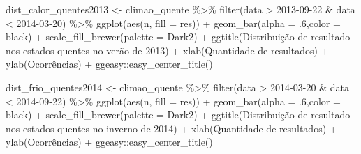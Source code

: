 \documentclass[
]{article}
\newenvironment{Shaded}{\begin{snugshade}}{\end{snugshade}}
\newcommand{\AttributeTok}[1]{\textcolor[rgb]{0.77,0.63,0.00}{#1}}
\newcommand{\DecValTok}[1]{\textcolor[rgb]{0.00,0.00,0.81}{#1}}
\newcommand{\FunctionTok}[1]{\textcolor[rgb]{0.00,0.00,0.00}{#1}}
\newcommand{\NormalTok}[1]{#1}
\newcommand{\OtherTok}[1]{\textcolor[rgb]{0.56,0.35,0.01}{#1}}
\newcommand{\SpecialCharTok}[1]{\textcolor[rgb]{0.00,0.00,0.00}{#1}}
\newcommand{\StringTok}[1]{\textcolor[rgb]{0.31,0.60,0.02}{#1}}
\begin{document}
\begin{Shaded}
\begin{Highlighting}[]
\NormalTok{dist\_calor\_quentes2013 }\OtherTok{\textless{}{-}}\NormalTok{ climao\_quente }\SpecialCharTok{\%\textgreater{}\%} 
  \FunctionTok{filter}\NormalTok{(data }\SpecialCharTok{\textgreater{}} \StringTok{\textquotesingle{}2013{-}09{-}22\textquotesingle{}} \SpecialCharTok{\&}\NormalTok{ data }\SpecialCharTok{\textless{}} \StringTok{\textquotesingle{}2014{-}03{-}20\textquotesingle{}}\NormalTok{) }\SpecialCharTok{\%\textgreater{}\%}
  \FunctionTok{ggplot}\NormalTok{(}\FunctionTok{aes}\NormalTok{(n, }\AttributeTok{fill =}\NormalTok{ res)) }\SpecialCharTok{+} 
  \FunctionTok{geom\_bar}\NormalTok{(}\AttributeTok{alpha =}\NormalTok{ .}\DecValTok{6}\NormalTok{,}\AttributeTok{color =} \StringTok{\textquotesingle{}black\textquotesingle{}}\NormalTok{) }\SpecialCharTok{+} 
  \FunctionTok{scale\_fill\_brewer}\NormalTok{(}\AttributeTok{palette =} \StringTok{\textquotesingle{}Dark2\textquotesingle{}}\NormalTok{) }\SpecialCharTok{+}
  \FunctionTok{ggtitle}\NormalTok{(}\StringTok{\textquotesingle{}Distribuição de resultado nos estados quentes no verão de 2013\textquotesingle{}}\NormalTok{) }\SpecialCharTok{+}
  \FunctionTok{xlab}\NormalTok{(}\StringTok{\textquotesingle{}Quantidade de resultados\textquotesingle{}}\NormalTok{) }\SpecialCharTok{+} \FunctionTok{ylab}\NormalTok{(}\StringTok{\textquotesingle{}Ocorrências\textquotesingle{}}\NormalTok{) }\SpecialCharTok{+}
\NormalTok{  ggeasy}\SpecialCharTok{::}\FunctionTok{easy\_center\_title}\NormalTok{()}



\NormalTok{dist\_frio\_quentes2014 }\OtherTok{\textless{}{-}}\NormalTok{ climao\_quente }\SpecialCharTok{\%\textgreater{}\%} 
  \FunctionTok{filter}\NormalTok{(data }\SpecialCharTok{\textgreater{}} \StringTok{\textquotesingle{}2014{-}03{-}20\textquotesingle{}} \SpecialCharTok{\&}\NormalTok{ data }\SpecialCharTok{\textless{}} \StringTok{\textquotesingle{}2014{-}09{-}22\textquotesingle{}}\NormalTok{) }\SpecialCharTok{\%\textgreater{}\%}
  \FunctionTok{ggplot}\NormalTok{(}\FunctionTok{aes}\NormalTok{(n, }\AttributeTok{fill =}\NormalTok{ res)) }\SpecialCharTok{+} 
  \FunctionTok{geom\_bar}\NormalTok{(}\AttributeTok{alpha =}\NormalTok{ .}\DecValTok{6}\NormalTok{,}\AttributeTok{color =} \StringTok{\textquotesingle{}black\textquotesingle{}}\NormalTok{) }\SpecialCharTok{+} 
  \FunctionTok{scale\_fill\_brewer}\NormalTok{(}\AttributeTok{palette =} \StringTok{\textquotesingle{}Dark2\textquotesingle{}}\NormalTok{) }\SpecialCharTok{+}
  \FunctionTok{ggtitle}\NormalTok{(}\StringTok{\textquotesingle{}Distribuição de resultado nos estados quentes no inverno de 2014\textquotesingle{}}\NormalTok{) }\SpecialCharTok{+}
  \FunctionTok{xlab}\NormalTok{(}\StringTok{\textquotesingle{}Quantidade de resultados\textquotesingle{}}\NormalTok{) }\SpecialCharTok{+} \FunctionTok{ylab}\NormalTok{(}\StringTok{\textquotesingle{}Ocorrências\textquotesingle{}}\NormalTok{) }\SpecialCharTok{+}
\NormalTok{  ggeasy}\SpecialCharTok{::}\FunctionTok{easy\_center\_title}\NormalTok{()}


\end{Highlighting}
\end{Shaded}
\end{document}
